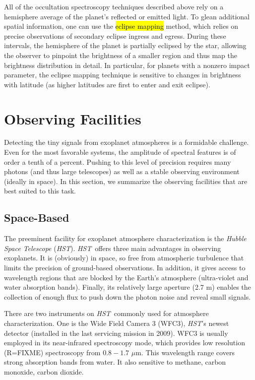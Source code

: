 \documentclass[graybox,natbib,nosecnum]{svmult}
\newcommand{\hbindex}[1]{\hl{#1}\index{#1}}  %
\newcommand{\project}[1]{\textsl{#1}}
\newcommand{\HST}{\project{HST}}
\begin{document}
All of the occultation spectroscopy techniques described above rely on a hemisphere average of the planet's reflected or emitted light. To glean additional spatial information, one can use the \hbindex{eclipse mapping} method, which relies on precise observations of secondary eclipse ingress and egress.  During these intervals, the hemisphere of the planet is partially eclipsed by the star, allowing the observer to pinpoint the brightness of a smaller region and thus map the brightness distribution in detail. In particular, for planets with a nonzero impact parameter, the eclipse mapping technique is sensitive to changes in brightness with latitude (as higher latitudes are first to enter and exit eclipse).

\section{Observing Facilities}
Detecting the tiny signals from exoplanet atmospheres is a formidable challenge. Even for the most favorable systems, the amplitude of spectral features is of order a tenth of a percent. Pushing to this level of precision requires many photons (and thus large telescopes) as well as a stable observing environment (ideally in space).  In this section, we summarize the observing facilities that are best suited to this task.

\subsection{Space-Based}
The preeminent facility for exoplanet atmosphere characterization is the \emph{Hubble Space Telescope} (\HST).
\HST\ offers three main advantages in observing exoplanets. It is (obviously) in space, so free from atmospheric turbulence that limits the precision of ground-based observations. In addition, it gives access to wavelength regions that are blocked by the Earth's atmosphere (ultra-violet and water absorption bands).  Finally, its relatively large aperture (2.7 m) enables the collection of enough flux to push down the photon noise and reveal small signals.

There are two instruments on \HST\ commonly used for atmosphere characterization. One is the Wide Field Camera 3 (WFC3), \HST's newest detector (installed in the last servicing mission in 2009). WFC3 is usually employed in its near-infrared spectroscopy mode, which provides low resolution (R=FIXME) spectroscopy from $0.8 - 1.7$ $\mu$m. This wavelength range covers strong absorption bands from water. It also sensitive to methane, carbon monoxide, carbon dioxide.
\end{document}
